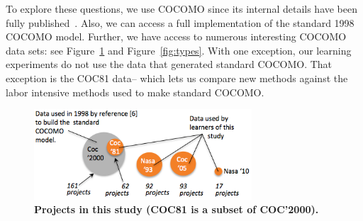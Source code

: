 \documentclass{sig-alternate}
\newcommand{\fig}[1]{Figure~\ref{fig:#1}}
\newenvironment{changed}{\par\color{MyDarkBlue}}{\par}
\newcommand{\ADD}[1]{\textcolor{MyDarkBlue}{{\bf #1}}}
\begin{document}
\begin{changed}
To explore these questions, we use  COCOMO since its
internal details have been fully
published~\cite{boehm00b}. Also, we can access a full implementation of the standard 1998
COCOMO model.
Further, we have access to numerous interesting  COCOMO data
sets: see \fig{dataused} and \fig{types}.
With one exception, our learning experiments do not use the data
that generated   standard COCOMO.
That exception is the  COC81 data-- which  lets us  compare new methods
against the  labor intensive methods used to make standard COCOMO. 
\end{changed}


\begin{figure}[!t]
\begin{center}
\includegraphics[width=3.2in]{datasets1.png}
\end{center}
\caption{\ADD{Projects in this study (COC81 is a subset of COC'2000).}}\label{fig:dataused}
\end{figure}
\end{document}
